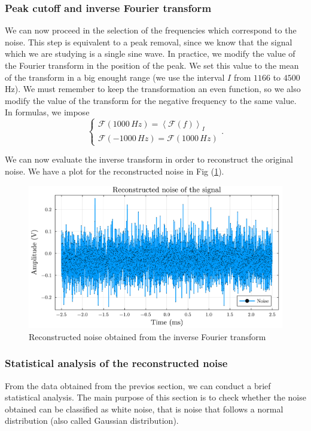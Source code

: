 \documentclass[a4paper,12pt]{article}
\begin{document}
\subsubsection{Peak cutoff and inverse Fourier transform }
\par We can now proceed in the selection of the frequencies which correspond to 
the noise. This step is equivalent to a peak removal, since we know that the signal 
which we are studying is a single sine wave. In practice, we modify the value of 
the Fourier transform in the position of the peak. We set this value to the mean 
of the transform in a big enought range (we use the interval $I$ from $1166$ to $4500$ Hz). 
We must remember to keep the transformation an even function, so we also modify the 
value of the transform for the negative frequency to the same value. In formulas, 
we impose 
\[
\begin{cases}
    \mathcal{F}(1000\, Hz) = \left\langle \mathcal{F}(f) \right\rangle_I \\
    \mathcal{F}(-1000\, Hz) = \mathcal{F}(1000\, Hz)
\end{cases}.
\]

\par We can now evaluate the inverse transform in order to reconstruct the original noise.
We have a plot for the reconstructed noise in Fig (\ref{plot:Only_noise}).
\begin{figure}[H]
    \centering
    \includegraphics[width=1\textwidth]{signal01_only_noise.pdf}
    \caption{Reconstructed noise obtained from the inverse Fourier transform}
    \label{plot:Only_noise}
\end{figure}

\subsubsection{Statistical analysis of the reconstructed noise}
\par From the data obtained from the previos section, we can conduct 
a brief statistical analysis. The main purpose of this section is to 
check whether the noise obtained can be classified as white noise, that is 
noise that follows a normal distribution (also called Gaussian distribution).
\end{document}
